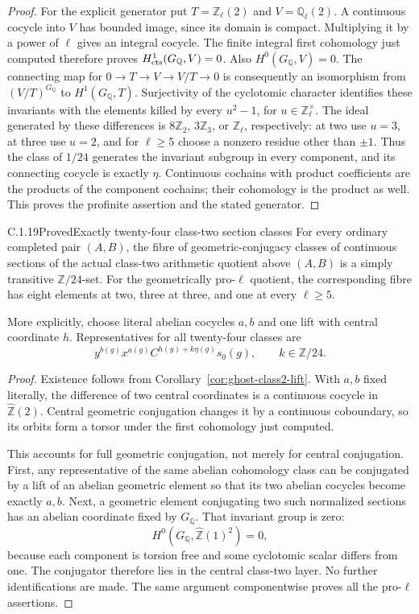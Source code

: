 \begin{proof}
For the explicit generator put \(T=\mathbb Z_\ell(2)\)
and \(V=\mathbb Q_\ell(2)\). A continuous cocycle into
\(V\) has bounded image, since its domain is compact.
Multiplying it by a power of \(\ell\) gives an integral
cocycle. The finite integral first cohomology just
computed therefore proves \(H^1_{\rm cts}(G_{\mathbb Q},V)=0\).
Also \(H^0(G_{\mathbb Q},V)=0\). The connecting map
for \(0\to T\to V\to V/T\to0\) is consequently an
isomorphism from \((V/T)^{G_{\mathbb Q}}\) to \(H^1(G_{\mathbb Q},T)\).
Surjectivity of the cyclotomic character identifies
these invariants with the elements killed by every
\(u^2-1\), for \(u\in\mathbb Z_\ell^\times\).
The ideal generated by these differences is
\(8\mathbb Z_2\), \(3\mathbb Z_3\), or \(\mathbb Z_\ell\),
respectively: at two use \(u=3\), at three use \(u=2\),
and for \(\ell\ge5\) choose a nonzero residue other
than \(\pm1\). Thus the class of \(1/24\) generates
the invariant subgroup in every component, and its
connecting cocycle is exactly \(\eta\).
Continuous cochains with product coefficients are the
products of the component cochains; their cohomology
is the product as well. This proves the profinite
assertion and the stated generator.
\end{proof}

\begin{result}{C.1.19}{Proved}{Exactly twenty-four class-two section classes}
\label{cor:ghost-class2-fibre24}
For every ordinary completed pair \((A,B)\), the fibre
of geometric-conjugacy classes of continuous sections
of the actual class-two arithmetic quotient above
\((A,B)\) is a simply transitive \(\mathbb Z/24\)-set.
For the geometrically pro-\(\ell\) quotient, the
corresponding fibre has eight elements at two, three
at three, and one at every \(\ell\ge5\).

More explicitly, choose literal abelian cocycles \(a,b\)
and one lift with central coordinate \(h\). Representatives
for all twenty-four classes are
\[
       y^{b(g)}x^{a(g)}C^{h(g)+k\eta(g)}s_0(g),
                 \qquad k\in\mathbb Z/24.
\]
\end{result}
\begin{proof}
Existence follows from Corollary~\ref{cor:ghost-class2-lift}.
With \(a,b\) fixed literally, the difference of two
central coordinates is a continuous cocycle in
\(\widehat{\mathbb Z}(2)\). Central geometric conjugation
changes it by a continuous coboundary, so its orbits
form a torsor under the first cohomology just computed.

This accounts for full geometric conjugation, not merely
for central conjugation. First, any representative of
the same abelian cohomology class can be conjugated by
a lift of an abelian geometric element so that its two
abelian cocycles become exactly \(a,b\). Next, a
geometric element conjugating two such normalized
sections has an abelian coordinate fixed by
\(G_{\mathbb Q}\). That invariant group is zero:
\[
 H^0(G_{\mathbb Q},\widehat{\mathbb Z}(1)^2)=0,
\]
because each component is torsion free and some
cyclotomic scalar differs from one. The conjugator
therefore lies in the central class-two layer.
No further identifications are made. The same argument
componentwise proves all the pro-\(\ell\) assertions.
\end{proof}
